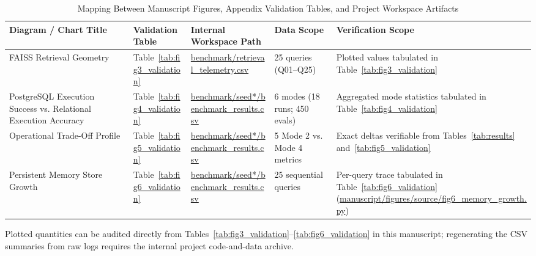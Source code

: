 \begin{table}[t]
\centering
\caption{Mapping Between Manuscript Figures, Appendix Validation Tables, and Project Workspace Artifacts}
\label{tab:figure_validation_matrix}
\footnotesize
\setlength{\tabcolsep}{3.5pt}
\renewcommand{\arraystretch}{1.05}
\begin{tabularx}{\textwidth}{@{}>{\raggedright\arraybackslash}p{4.0cm} p{2.0cm} >{\raggedright\arraybackslash}p{4.2cm} p{2.3cm} >{\raggedright\arraybackslash}X@{}}
\toprule
\textbf{Diagram / Chart Title} & \textbf{Validation Table} & \textbf{Internal Workspace Path} & \textbf{Data Scope} & \textbf{Verification Scope} \\
\midrule
FAISS Retrieval Geometry & Table~\ref{tab:fig3_validation} & \url{benchmark/retrieval_telemetry.csv} & 25 queries (Q01--Q25) & Plotted values tabulated in Table~\ref{tab:fig3_validation} \\
PostgreSQL Execution Success vs. Relational Execution Accuracy & Table~\ref{tab:fig4_validation} & \url{benchmark/seed*/benchmark_results.csv} & 6 modes (18 runs; 450 evals) & Aggregated mode statistics tabulated in Table~\ref{tab:fig4_validation} \\
Operational Trade-Off Profile & Table~\ref{tab:fig5_validation} & \url{benchmark/seed*/benchmark_results.csv} & 5 Mode 2 vs. Mode 4 metrics & Exact deltas verifiable from Tables~\ref{tab:results} and~\ref{tab:fig5_validation} \\
Persistent Memory Store Growth & Table~\ref{tab:fig6_validation} & \url{benchmark/seed*/benchmark_results.csv} & 25 sequential queries & Per-query trace tabulated in Table~\ref{tab:fig6_validation} (\url{manuscript/figures/source/fig6_memory_growth.py}) \\
\bottomrule
\end{tabularx}
\vspace{2.0pt}
\begin{minipage}{\textwidth}
\scriptsize Plotted quantities can be audited directly from Tables~\ref{tab:fig3_validation}--\ref{tab:fig6_validation} in this manuscript; regenerating the CSV summaries from raw logs requires the internal project code-and-data archive.
\end{minipage}
\end{table}




